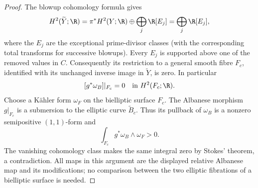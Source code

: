\begin{proof}
The blowup cohomology formula gives
\[
 H^2(\widetilde Y;\R)
 =\pi^*H^2(Y;\R)\oplus\bigoplus_j\R[E_j]
 =\bigoplus_j\R[E_j],
\]
where the $E_j$ are the exceptional prime-divisor classes (with
the corresponding total transforms for successive blowups).
Every $E_j$ is supported above one of the removed values in $C$.
Consequently its restriction to a general smooth fibre $F_c$,
identified with its unchanged inverse image in $\widetilde Y$,
is zero. In particular
\[
 [g^*\omega_B]|_{F_c}=0\quad\hbox{in }H^2(F_c;\R).
\]
Choose a K\"ahler form $\omega_F$ on the bielliptic surface $F_c$.
The Albanese morphism $g|_{F_c}$ is a submersion to the elliptic
curve $\widetilde B_c$. Thus its pullback of $\omega_B$ is a
nonzero semipositive $(1,1)$-form and
\[
 \int_{F_c}g^*\omega_B\wedge\omega_F>0.
\]
The vanishing cohomology class makes the same integral zero by
Stokes' theorem, a contradiction. All maps in this argument are
the displayed relative Albanese map and its modifications; no
comparison between the two elliptic fibrations of a bielliptic
surface is needed.
\end{proof}

